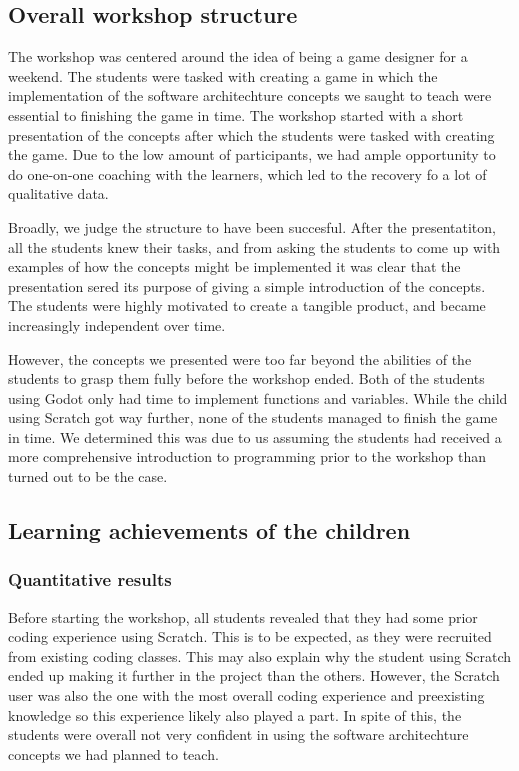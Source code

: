 \subsection{Overall workshop structure}
The workshop was centered around the idea of being a game designer
for a weekend.
The students were tasked with creating a game in which
the implementation of the software architechture concepts we saught
to teach were essential to finishing the game in time.
The workshop
started with a short presentation of the concepts after which the
students were tasked with creating the game.
Due to the low amount of
participants, we had ample opportunity to do one-on-one coaching with
the learners, which led to the recovery fo a lot of qualitative data.

Broadly, we judge the structure to have been succesful.
After the
presentatiton, all the students knew their tasks, and from asking the
students to come up with examples of how the concepts might be
implemented it was clear that the presentation sered its purpose of
giving a simple introduction of the concepts.
The students were
highly motivated to create a tangible product, and became
increasingly independent over time.

However, the concepts we presented were too far beyond the abilities
of the students to grasp them fully before the workshop ended.
Both
of the students using Godot only had time to implement functions and
variables.
While the child using Scratch got way further, none of the
students managed to finish the game in time.
We determined this was
due to us assuming the students had received a more comprehensive
introduction to programming prior to the workshop than turned out to
be the case.



\subsection{Learning achievements of the children}

\subsubsection{Quantitative results}
Before starting the workshop, all students revealed that they had some prior coding experience using Scratch. This is to be expected, as they were recruited from existing coding classes. This may also explain why the student using Scratch ended up making it further in the project than the others. However, the Scratch user was also the one with the most overall coding experience and preexisting knowledge so this experience likely also played a part. In spite of this, the students were overall not very confident in using the  software architechture concepts we had planned to teach.


